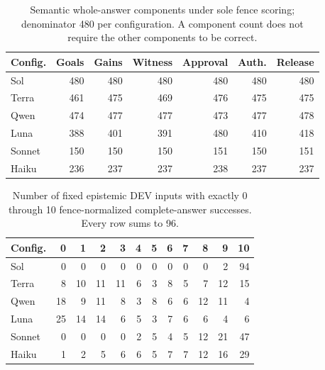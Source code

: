 \documentclass[a4paper,preprint,12pt,numbers,nopreprintline]{elsarticle}
\begin{document}
\begin{table}[htbp]\centering\scriptsize
\caption{Semantic whole-answer components under sole fence scoring; denominator 480 per configuration. A component count does not require the other components to be correct.}\label{tab:components-semantic-framing_sensitivity}
\setlength{\tabcolsep}{3pt}
\begin{tabular}{lrrrrrr}\toprule
Config. & Goals & Gains & Witness & Approval & Auth. & Release\\\midrule
Sol & 480 & 480 & 480 & 480 & 480 & 480\\
Terra & 461 & 475 & 469 & 476 & 475 & 475\\
Qwen & 474 & 477 & 477 & 473 & 477 & 478\\
Luna & 388 & 401 & 391 & 480 & 410 & 418\\
Sonnet & 150 & 150 & 150 & 151 & 150 & 151\\
Haiku & 236 & 237 & 237 & 238 & 237 & 237\\
\bottomrule\end{tabular}
\end{table}
\begin{table}[htbp]\centering\scriptsize
\caption{Number of fixed epistemic DEV inputs with exactly 0 through 10 fence-normalized complete-answer successes. Every row sums to 96.}\label{tab:consistency-epistemic}
\setlength{\tabcolsep}{3pt}
\begin{tabular}{lrrrrrrrrrrr}\toprule
Config. & 0 & 1 & 2 & 3 & 4 & 5 & 6 & 7 & 8 & 9 & 10\\\midrule
Sol & 0 & 0 & 0 & 0 & 0 & 0 & 0 & 0 & 0 & 2 & 94\\
Terra & 8 & 10 & 11 & 11 & 6 & 3 & 8 & 5 & 7 & 12 & 15\\
Qwen & 18 & 9 & 11 & 8 & 3 & 8 & 6 & 6 & 12 & 11 & 4\\
Luna & 25 & 14 & 14 & 6 & 5 & 3 & 7 & 6 & 6 & 4 & 6\\
Sonnet & 0 & 0 & 0 & 0 & 2 & 5 & 4 & 5 & 12 & 21 & 47\\
Haiku & 1 & 2 & 5 & 6 & 6 & 5 & 7 & 7 & 12 & 16 & 29\\
\bottomrule\end{tabular}
\end{table}
\end{document}
